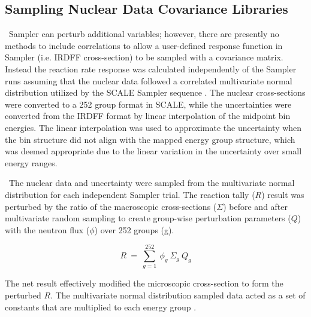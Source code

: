 \subsection{Sampling Nuclear Data Covariance Libraries}

\ Sampler can perturb additional variables; however, there are presently no methods to include correlations to allow a user-defined response function in Sampler (i.e. IRDFF cross-section) to be sampled with a covariance matrix.   
Instead the reaction rate response was calculated independently of the Sampler runs assuming that the nuclear data followed a correlated multivariate normal distribution utilized by the SCALE Sampler sequence \cite{Wieselquist2013, Zhu2015, Williams2013, SCALE}. 
The nuclear cross-sections were converted to a 252 group format in SCALE, while the uncertainties were converted from the IRDFF format by linear interpolation of the midpoint bin energies. 
The linear interpolation was used to approximate the uncertainty when the bin structure did not align with the mapped energy group structure, which was deemed appropriate due to the linear variation in the uncertainty over small energy ranges. 

\ The nuclear data and uncertainty were sampled from the multivariate normal distribution for each independent Sampler trial. 
The reaction tally ($R$) result was perturbed by the ratio of the macroscopic cross-sections ($\Sigma$) before and after multivariate random sampling to create group-wise perturbation parameters ($Q$) with the neutron flux ($\phi$) over 252 groups (g). 

\begin{equation} \label{eq:LeastSq1}
R\  =\ \sum_{g=1}^{252} \ \phi_{g}  \ \Sigma_{g} \ Q_{g}
\end{equation} 

\noindent The net result effectively modified the microscopic cross-section to form the perturbed $R$. 
The multivariate normal distribution sampled data acted as a set of constants that are multiplied to each energy group  \cite{Williams2013}. 
 



